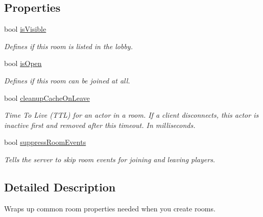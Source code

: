 \subsection*{Properties}
\begin{DoxyCompactItemize}
\item 
bool \hyperlink{class_room_options_a750b1c08061aa357ae1d1e189cf8b66c}{is\+Visible}
\begin{DoxyCompactList}\small\item\em Defines if this room is listed in the lobby. \end{DoxyCompactList}\item 
bool \hyperlink{class_room_options_adcfa176960d9ab8c0e3667d7c6810192}{is\+Open}
\begin{DoxyCompactList}\small\item\em Defines if this room can be joined at all. \end{DoxyCompactList}\item 
bool \hyperlink{class_room_options_a30d0b25a8b85c9232a8a9140bc7def4b}{cleanup\+Cache\+On\+Leave}
\begin{DoxyCompactList}\small\item\em Time To Live (T\+TL) for an \textquotesingle{}actor\textquotesingle{} in a room. If a client disconnects, this actor is inactive first and removed after this timeout. In milliseconds.\end{DoxyCompactList}\item 
bool \hyperlink{class_room_options_a0322774781bc0f5a76e8ea607af453ee}{suppress\+Room\+Events}
\begin{DoxyCompactList}\small\item\em Tells the server to skip room events for joining and leaving players. \end{DoxyCompactList}\end{DoxyCompactItemize}


\subsection{Detailed Description}
Wraps up common room properties needed when you create rooms. 


